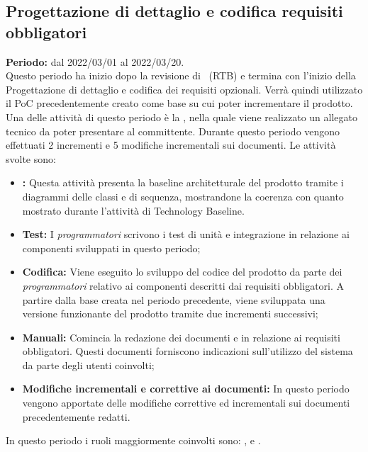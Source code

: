 
 \subsection{Progettazione di dettaglio e codifica requisiti obbligatori} \label{subsection:pianificazione_requisiti_obbligatori}
\textbf{Periodo:} dal 2022/03/01 al 2022/03/20.
\bigskip
\\Questo periodo ha inizio dopo la revisione di \RTB\ (RTB) e termina con l'inizio della Progettazione di dettaglio e codifica dei requisiti opzionali.
Verrà quindi utilizzato il PoC precedentemente creato come base su cui poter incrementare il prodotto.
Una delle attività di questo periodo è la \PB, nella quale viene realizzato un allegato tecnico da poter presentare al committente.
Durante questo periodo vengono effettuati 2 incrementi e 5 modifiche incrementali sui documenti.
Le attività svolte sono:
\begin{itemize}
  \item \textbf{\PB:} Questa attività presenta la baseline architetturale del prodotto tramite i diagrammi delle classi e di sequenza, mostrandone la coerenza con quanto mostrato durante l'attività di Technology Baseline.
  \item \textbf{Test:} I \textit{programmatori} scrivono i test di unità e integrazione in relazione ai componenti sviluppati in questo periodo;
  \item \textbf{Codifica:} Viene eseguito lo sviluppo del codice del prodotto da parte dei \textit{programmatori} relativo ai componenti descritti dai requisiti obbligatori.
  A partire dalla base creata nel periodo precedente, viene sviluppata una versione funzionante del prodotto tramite due incrementi successivi;
  \item \textbf{Manuali:} Comincia la redazione dei documenti \docNameVersionMU{} e \docNameVersionMS{} in relazione ai requisiti obbligatori.
  Questi documenti forniscono indicazioni sull'utilizzo del sistema da parte degli utenti coinvolti;
  \item \textbf{Modifiche incrementali e correttive ai documenti:} In questo periodo vengono apportate delle modifiche correttive ed incrementali sui documenti precedentemente redatti.
\end{itemize}
In questo periodo i ruoli maggiormente coinvolti sono: \roleDesignerLow{}, \roleProgrammerLow{} e \roleVerifierLow{}.
\bigskip
